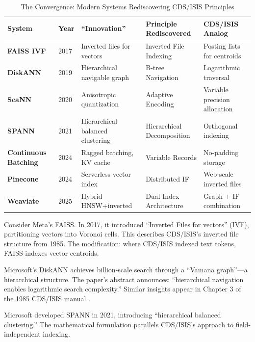 \documentclass[manuscript,screen,nonacm]{acmart}
\begin{document}
\begin{table}[h]
\centering
\caption{The Convergence: Modern Systems Rediscovering CDS/ISIS Principles}
\label{tab:convergence}
\begin{tabular}{p{} p{} p{} p{} p{}}
\toprule
\textbf{System} & \textbf{Year} & \textbf{``Innovation''} & \textbf{Principle Rediscovered} & \textbf{CDS/ISIS Analog} \\
\midrule
\textbf{FAISS IVF} \cite{johnson2017} & 2017 & Inverted files for vectors & Inverted File Indexing & Posting lists for centroids \\
\textbf{DiskANN} \cite{subramanya2019} & 2019 & Hierarchical navigable graph & B-tree Navigation & Logarithmic traversal \\
\textbf{ScaNN} \cite{guo2020} & 2020 & Anisotropic quantization & Adaptive Encoding & Variable precision allocation \\
\textbf{SPANN} \cite{chen2021} & 2021 & Hierarchical balanced clustering & Hierarchical Decomposition & Orthogonal indexing \\
\textbf{Continuous Batching} \cite{reboul2025} & 2024 & Ragged batching, KV cache & Variable Records & No-padding storage \\
\textbf{Pinecone} \cite{pinecone2024} & 2024 & Serverless vector index & Distributed IF & Web-scale inverted files \\
\textbf{Weaviate} \cite{weaviate2025} & 2025 & Hybrid HNSW+inverted & Dual Index Architecture & Graph + IF combination \\
\bottomrule
\end{tabular}
\end{table}

Consider Meta's FAISS. In 2017, it introduced ``Inverted Files for vectors'' (IVF), partitioning vectors into Voronoi cells. This describes CDS/ISIS's inverted file structure from 1985. The modification: where CDS/ISIS indexed text tokens, FAISS indexes vector centroids.

Microsoft's DiskANN achieves billion-scale search through a ``Vamana graph''---a hierarchical structure. The paper's abstract announces: ``hierarchical navigation enables logarithmic search complexity.'' Similar insights appear in Chapter 3 of the 1985 CDS/ISIS manual \cite{unesco1989}.

Microsoft developed SPANN in 2021, introducing ``hierarchical balanced clustering.'' The mathematical formulation parallels CDS/ISIS's approach to field-independent indexing.
\end{document}
